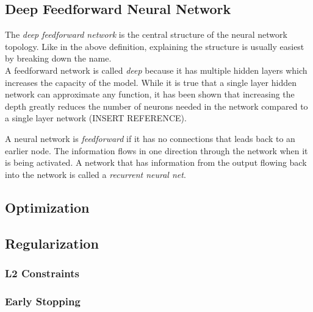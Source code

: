 
\subsection{Deep Feedforward Neural Network}

The \emph{deep feedforward network} is the central structure of the neural network topology. Like in the above definition, explaining the structure is usually easiest by breaking down the name.\\

A feedforward network is called \emph{deep} because it has multiple hidden layers which increases the capacity of the model. While it is true that a single layer hidden network can approximate any function, it has been shown that increasing the depth greatly reduces the number of neurons needed in the network compared to a single layer network (INSERT REFERENCE).

A neural network is \emph{feedforward} if it has no connections that leads back to an earlier node. The information flows in one direction through the network when it is being activated. A network that has information from the output flowing back into the network is called a \emph{recurrent neural net}. 


\subsection{Optimization}
\label{nn_optimization}


\subsection{Regularization}



\subsubsection{L2 Constraints}

\subsubsection{Early Stopping}



